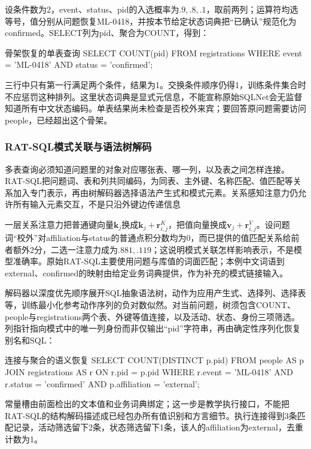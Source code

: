 设条件数为2，event、status、pid的入选概率为$.9,.8,.1$，取前两列；运算符均选等号，值分别从问题恢复ML-0418，并按本节给定状态词典把“已确认”规范化为confirmed。SELECT列为pid、聚合为COUNT，得到：
\begin{codeblock}[language=SQL]{骨架恢复的单表查询}
SELECT COUNT(pid) FROM registrations
WHERE event = 'ML-0418' AND status = 'confirmed';
\end{codeblock}
三行中只有第一行满足两个条件，结果为1。交换条件顺序仍得1，训练条件集合时不应惩罚这种排列。这里状态词典是显式元信息，不能宣称原始SQLNet会无监督知道所有中文状态编码。单表结果尚未检查是否校外来宾；要回答原问题需要访问people，已经超出这个骨架。

\subsubsection{RAT-SQL模式关联与语法树解码}
\label{sec:nlp-analysis-ratsql}

多表查询必须知道问题里的对象对应哪张表、哪一列，以及表之间怎样连接。RAT-SQL把问题词、表和列共同编码，为同表、主外键、名称匹配、值匹配等关系加入专门表示，再由树解码器选择语法产生式和模式元素。关系感知注意力仍允许所有输入元素交互，不是只沿外键边传递信息

一层关系注意力把普通键向量$\bm k_j$换成$\bm k_j+\bm r^K_{i,j}$，把值向量换成$\bm v_j+\bm r^V_{i,j}$。设问题词“校外”对affiliation与status的普通点积分数均为0，而已提供的值匹配关系给前者额外2分，二选一注意力成为$.881,.119$；这说明模式关联怎样影响表示，不是模型准确率。原始RAT-SQL主要使用问题与库值的词面匹配；本例中文词语到external、confirmed的映射由给定业务词典提供，作为补充的模式链接输入。

解码器以深度优先顺序展开SQL抽象语法树，动作为应用产生式、选择列、选择表等，训练最小化参考动作序列的负对数似然。对当前问题，树须包含COUNT、people与registrations两个表、外键等值连接，以及活动、状态、身份三项筛选。列指针指向模式中的唯一列身份而非仅输出“pid”字符串，再由确定性序列化恢复别名和SQL：
\begin{codeblock}[language=SQL]{连接与聚合的语义恢复}
SELECT COUNT(DISTINCT p.pid)
FROM people AS p
JOIN registrations AS r ON r.pid = p.pid
WHERE r.event = 'ML-0418'
  AND r.status = 'confirmed'
  AND p.affiliation = 'external';
\end{codeblock}
常量槽由前面检出的文本值和业务词典绑定；这一步是教学执行接口，不能把RAT-SQL的结构解码描述成已经包办所有值识别和方言细节。执行连接得到3条匹配记录，活动筛选留下2条，状态筛选留下1条，该人的affiliation为external，去重计数为1。

